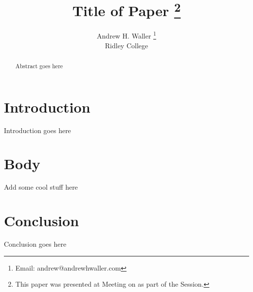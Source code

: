 \documentclass{article}
\date{}
\title{
  Title of Paper
  \thanks{This paper was presented at Meeting on \DTMusedate{date} as part of the Session.}
}
\author{
  {Andrew H. Waller \thanks{Email: andrew@andrewhwaller.com}}\\
  Ridley College \\
}
\begin{document}
\maketitle
\begin{abstract}
  Abstract goes here
\end{abstract}
\section{Introduction}
  Introduction goes here
\section{Body}
  Add some cool stuff here
\section{Conclusion}
  Conclusion goes here
\pagebreak
\printbibliography
\end{document}
